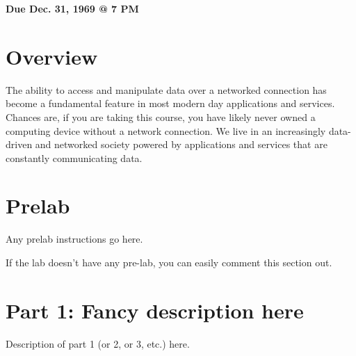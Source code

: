 \documentclass[11pt]{article}
\makeatletter
\def\datedue{Dec. 31, 1969 @ 7 PM}
\makeatother
\begin{document}
\maketitle \thispagestyle{fancy}

\hfill {\large \textbf{Due \datedue}}


\section{Overview}
\label{sec:overview}
The ability to access and manipulate data over a networked connection has become a fundamental feature in most modern day applications and services. Chances are, if you are taking this course, you have likely never owned a computing device without a network connection. We live in an increasingly data-driven and networked society powered by applications and services that are constantly communicating data.




\section{Prelab}
\label{sec:prelab}
Any prelab instructions go here.


If the lab doesn't have any pre-lab, you can easily comment this section out.

\section{Part 1: Fancy description here}
\label{sec:part1}
Description of part 1 (or 2, or 3, etc.) here.
\end{document}
